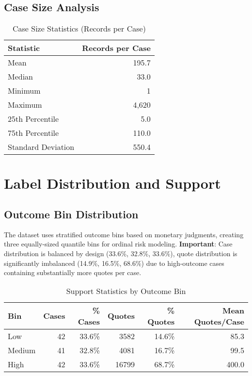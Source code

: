 \documentclass[11pt]{article}
\begin{document}
\subsection{Case Size Analysis}

\begin{table}[H]
\centering
\caption{Case Size Statistics (Records per Case)}
\begin{tabular}{lr}
\toprule
\textbf{Statistic} & \textbf{Records per Case} \\
\midrule
Mean & 195.7 \\
Median & 33.0 \\
Minimum & 1 \\
Maximum & 4,620 \\
25th Percentile & 5.0 \\
75th Percentile & 110.0 \\
Standard Deviation & 550.4 \\
\bottomrule
\end{tabular}
\end{table}

\section{Label Distribution and Support}

\subsection{Outcome Bin Distribution}

The dataset uses stratified outcome bins based on monetary judgments, creating three equally-sized quantile bins for ordinal risk modeling. \textbf{Important}: Case distribution is balanced by design (33.6\%, 32.8\%, 33.6\%), quote distribution is significantly imbalanced (14.9\%, 16.5\%, 68.6\%) due to high-outcome cases containing substantially more quotes per case.

\begin{table}[H]
\centering
\caption{Support Statistics by Outcome Bin}
\begin{tabular}{lrrrrr}
\toprule
\textbf{Bin} & \textbf{Cases} & \textbf{\% Cases} & \textbf{Quotes} & \textbf{\% Quotes} & \textbf{Mean Quotes/Case} \\
\midrule
Low & 42 & 33.6\% & 3582 & 14.6\% & 85.3 \\
Medium & 41 & 32.8\% & 4081 & 16.7\% & 99.5 \\
High & 42 & 33.6\% & 16799 & 68.7\% & 400.0 \\

\bottomrule
\end{tabular}
\end{table}
\end{document}
